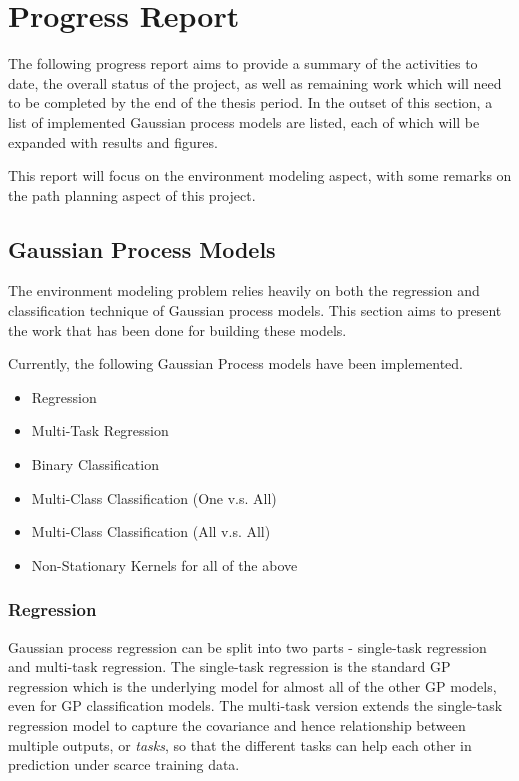 \chapter{Progress Report}
\label{ProgressReport}

	The following progress report aims to provide a summary of the activities to date, the overall status of the project, as well as remaining work which will need to be completed by the end of the thesis period. In the outset of this section, a list of implemented Gaussian process models are listed, each of which will be expanded with results and figures. %
	
	This report will focus on the environment modeling aspect, with some remarks on the path planning aspect of this project.

	\section{Gaussian Process Models}
	\label{ProgressReport:GaussianProcessModels}
	
		The environment modeling problem relies heavily on both the regression and classification technique of Gaussian process models. This section aims to present the work that has been done for building these models.
		
		Currently, the following Gaussian Process models have been implemented.
		
		\begin{itemize}
			\item Regression
			\item Multi-Task Regression
			\item Binary Classification
			\item Multi-Class Classification (One v.s. All)
			\item Multi-Class Classification (All v.s. All)
			\item Non-Stationary Kernels for all of the above
		\end{itemize}
		
		\subsection{Regression}

			Gaussian process regression can be split into two parts - single-task regression and multi-task regression. The single-task regression is the standard GP regression which is the underlying model for almost all of the other GP models, even for GP classification models. The multi-task version extends the single-task regression model to capture the covariance and hence relationship between multiple outputs, or \textit{tasks}, so that the different tasks can help each other in prediction under scarce training data.
			
